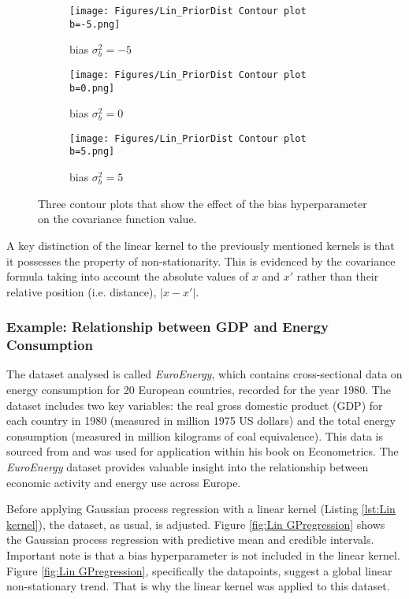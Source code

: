 \documentclass[12pt,a4paper]{article}
\begin{document}
\begin{figure}[h]
    \centering
    \begin{subfigure}[b]{0.3\textwidth}
        \centering
        \texttt{[image: Figures/Lin\_PriorDist Contour plot b=-5.png]}
        \caption{bias \(\sigma_b^2 = -5\)}
    \end{subfigure}%
    \begin{subfigure}[b]{0.3\textwidth}
        \centering
        \texttt{[image: Figures/Lin\_PriorDist Contour plot b=0.png]}
        \caption{bias \(\sigma_b^2 = 0\)}
        \label{fig:Lin_PriorDist Contour plot b=0}
    \end{subfigure}%
    \begin{subfigure}[b]{0.3\textwidth}
        \centering
        \texttt{[image: Figures/Lin\_PriorDist Contour plot b=5.png]}
        \caption{bias \(\sigma_b^2 = 5\)}
    \end{subfigure}
    \caption{Three contour plots that show the effect of the bias hyperparameter on the covariance function value.}
    \label{fig:Lin kernel contour plots}
\end{figure}

A key distinction of the linear kernel to the previously mentioned kernels is that it possesses the property of non-stationarity. This is evidenced by the covariance formula taking into account the absolute values of \(x\) and \(x'\) rather than their relative position (i.e. distance), \(|x - x'|\).

\subsubsection{Example: Relationship between GDP and Energy Consumption}

The dataset analysed is called \textit{EuroEnergy}, which contains cross-sectional data on energy consumption for 20 European countries, recorded for the year 1980. The dataset includes two key variables: the real gross domestic product (GDP) for each country in 1980 (measured in million 1975 US dollars) and the total energy consumption (measured in million kilograms of coal equivalence). This data is sourced from \citet{baltagi2008econometric} and was used for application within his book on Econometrics. The \textit{EuroEnergy} dataset provides valuable insight into the relationship between economic activity and energy use across Europe.

Before applying Gaussian process regression with a linear kernel (Listing \ref{lst:Lin kernel}), the dataset, as usual, is adjusted. Figure \ref{fig:Lin GPregression} shows the Gaussian process regression with predictive mean and credible intervals. Important note is that a bias hyperparameter is not included in the linear kernel. Figure \ref{fig:Lin GPregression}, specifically the datapoints, suggest a global linear non-stationary trend. That is why the linear kernel was applied to this dataset.
\end{document}
